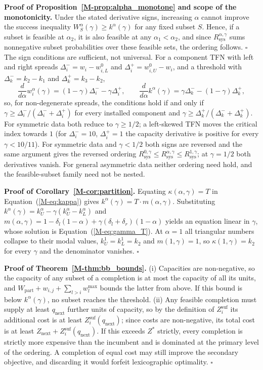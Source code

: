 \documentclass[11pt]{article}
\newcommand{\Rsys}{R_{\mathrm{sys}}}\newcommand{\Rtarget}{R_{\mathrm{target}}}
\newcommand{\kag}{k^{\alpha}(\gamma)}\newcommand{\WS}{\tilde{W}_S}\newcommand{\Zsuf}{Z^{\mathrm{suf}}}
\begin{document}
\textbf{Proof of Proposition~\ref*{M-prop:alpha_monotone} and scope of the monotonicity.} Under the stated
derivative signs, increasing $\alpha$ cannot improve the success inequality $W_S^\alpha(\gamma) \ge \kag$ for any
fixed subset $S$. Hence, if a subset is feasible at $\alpha_2$, it is also feasible at any $\alpha_1<\alpha_2$,
and since $\Rsys^{\alpha,\gamma}$ sums nonnegative subset probabilities over these feasible sets, the ordering
follows. $\square$ The sign conditions are sufficient, not universal. For a component TFN with left and right
spreads $\Delta_i^{-} = w_i-w_{i,L}^0$ and $\Delta_i^{+} = w_{i,U}^0-w_i$, and a threshold with
$\Delta_k^{-} = k_2-k_1$ and $\Delta_k^{+} = k_3-k_2$,
\begin{equation}
\frac{d}{d\alpha}w_i^\alpha(\gamma) = (1-\gamma)\Delta_i^{-}-\gamma \Delta_i^{+},
\qquad
\frac{d}{d\alpha}\kag = \gamma \Delta_k^{-}-(1-\gamma)\Delta_k^{+},
\end{equation}
so, for non-degenerate spreads, the conditions hold if and only if
$\gamma \ge \Delta_i^{-}/(\Delta_i^{-}+\Delta_i^{+})$ for every installed component and
$\gamma \ge \Delta_k^{+}/(\Delta_k^{-}+\Delta_k^{+})$. For symmetric data both reduce to $\gamma \ge 1/2$; a
left-skewed TFN moves the critical index towards $1$ (for $\Delta_i^{-}=10$, $\Delta_i^{+}=1$ the capacity
derivative is positive for every $\gamma<10/11$). For symmetric data and $\gamma<1/2$ both signs are reversed
and the same argument gives the reversed ordering $\Rsys^{0,\gamma}\le \Rsys^{\alpha,\gamma}\le \Rsys^{1,\gamma}$;
at $\gamma=1/2$ both derivatives vanish. For general asymmetric data neither ordering need hold, and the
feasible-subset family need not be nested.

\textbf{Proof of Corollary~\ref*{M-cor:partition}.} Equating $\kappa(\alpha,\gamma) = T$ in
Equation~(\ref*{M-eq:kappa}) gives $\kag = T \cdot m(\alpha,\gamma)$. Substituting
$\kag = k_U^\alpha - \gamma(k_U^\alpha - k_L^\alpha)$ and
$m(\alpha,\gamma) = 1 - \delta_l(1-\alpha) + \gamma(\delta_l+\delta_r)(1-\alpha)$ yields an equation linear in
$\gamma$, whose solution is Equation~(\ref*{M-eq:gamma_T}). At $\alpha = 1$ all triangular numbers collapse to
their modal values, $k_U^1 = k_L^1 = k_2$ and $m(1,\gamma) = 1$, so $\kappa(1,\gamma) = k_2$ for every $\gamma$
and the denominator vanishes. $\square$

\textbf{Proof of Theorem~\ref*{M-thm:bb_bounds}.} (i) Capacities are non-negative, so the capacity of any subset
of a completion is at most the capacity of all its units, and $W_{\mathrm{part}} + w_{i,j} + \sum_{l>i} w_l^{\mathrm{max}}$
bounds the latter from above. If this bound is below $\kag$, no subset reaches the threshold.
(ii) Any feasible completion must supply at least $q_{\mathrm{next}}$ further units of capacity, so by the
definition of $\Zsuf_{i}$ its additional cost is at least $\Zsuf_{i}(q_{\mathrm{next}})$; since costs are
non-negative, its total cost is at least $Z_{\mathrm{next}} + \Zsuf_{i}(q_{\mathrm{next}})$. If this
exceeds $Z^{*}$ strictly, every completion is strictly more expensive than the incumbent and is dominated
at the primary level of the ordering. A completion of equal cost may still improve the secondary objective,
and discarding it would forfeit lexicographic optimality. $\square$
\end{document}
